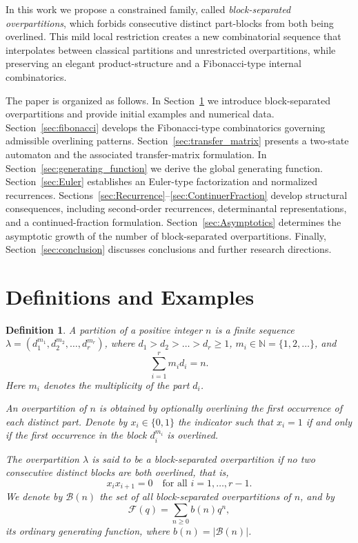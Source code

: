\documentclass[letterpaper,12pt]{article}
\newtheorem{definition}{Definition}
\begin{document}
In this work we propose a constrained family, called \emph{block-separated overpartitions}, which forbids consecutive distinct part-blocks from both being overlined.
This mild local restriction creates a new combinatorial sequence that interpolates between classical partitions and unrestricted overpartitions, while preserving an elegant product-structure and a Fibonacci-type internal combinatorics.



The paper is organized as follows. In Section~\ref{sec:definiton} we introduce block-separated overpartitions and provide initial examples and numerical data. 
Section~\ref{sec:fibonacci} develops the Fibonacci-type combinatorics governing admissible overlining patterns. 
Section~\ref{sec:transfer_matrix} presents a two-state automaton and the associated transfer-matrix formulation. 
In Section~\ref{sec:generating_function} we derive the global generating function. 
Section~\ref{sec:Euler} establishes an Euler-type factorization and normalized recurrences. 
Sections~\ref{sec:Recurrence}–\ref{sec:ContinuerFraction} develop structural consequences, including second-order recurrences, determinantal representations, and a continued-fraction formulation. 
Section~\ref{sec:Asymptotics} determines the asymptotic growth of the number of block-separated overpartitions. 
Finally, Section~\ref{sec:conclusion} discusses conclusions and further research directions.



 
\section{Definitions and   Examples}\label{sec:definiton}

\begin{definition}
A \emph{partition} of a positive integer $n$ is a finite sequence $\lambda = (d_1^{m_1}, d_2^{m_2}, \dots, d_r^{m_r})$, where $d_1 > d_2 > \dots > d_r \ge 1$,  $m_i \in \mathbb{N}=\{1,2,\ldots\}$, and  
\[
\sum_{i=1}^r m_i d_i = n.
\]
Here $m_i$ denotes the \emph{multiplicity} of the part $d_i$.

An \emph{overpartition} of \(n\) is obtained by optionally overlining the first occurrence of each distinct part.
Denote by \(x_i \in \{0,1\}\) the indicator such that \(x_i = 1\) if and only if the first occurrence in the block \(d_i^{m_i}\) is overlined.

The overpartition \(\lambda\) is said to be a \emph{block-separated overpartition} if no two consecutive distinct blocks are both overlined, that is,
\[
x_i x_{i+1} = 0 \quad \text{for all } i=1,\ldots,r-1.
\]
We denote by \( \mathcal{B}(n) \) the set of all block-separated overpartitions of \( n \), and by
\[
\mathcal{F}(q) = \sum_{n\ge0} b(n) q^n,
\]
its ordinary generating function, where $b(n) = |\mathcal{B}(n)|$.
\end{definition}
\end{document}

